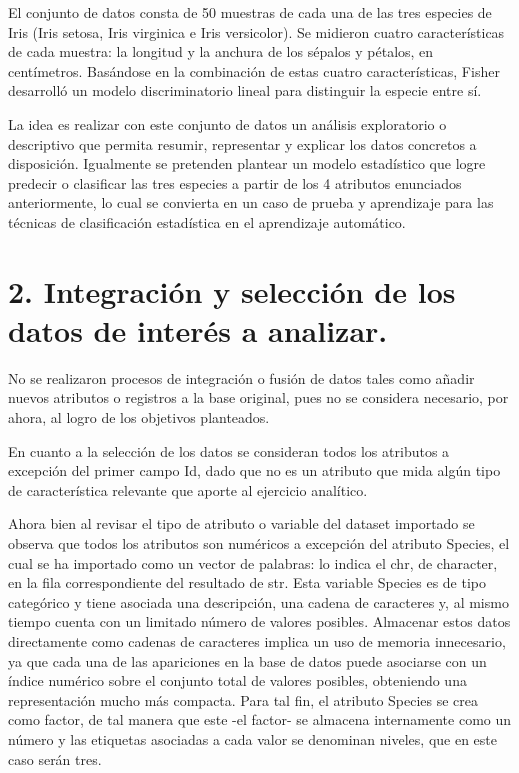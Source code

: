 \documentclass[
]{article}
\newenvironment{Shaded}{\begin{snugshade}}{\end{snugshade}}
\newcommand{\CommentTok}[1]{\textcolor[rgb]{0.56,0.35,0.01}{\textit{#1}}}
\newcommand{\ConstantTok}[1]{\textcolor[rgb]{0.00,0.00,0.00}{#1}}
\newcommand{\NormalTok}[1]{#1}
\newcommand{\OtherTok}[1]{\textcolor[rgb]{0.56,0.35,0.01}{#1}}
\newcommand{\SpecialCharTok}[1]{\textcolor[rgb]{0.00,0.00,0.00}{#1}}
\begin{document}
El conjunto de datos consta de 50 muestras de cada una de las tres
especies de Iris (Iris setosa, Iris virginica e Iris versicolor). Se
midieron cuatro características de cada muestra: la longitud y la
anchura de los sépalos y pétalos, en centímetros. Basándose en la
combinación de estas cuatro características, Fisher desarrolló un modelo
discriminatorio lineal para distinguir la especie entre sí.

La idea es realizar con este conjunto de datos un análisis exploratorio
o descriptivo que permita resumir, representar y explicar los datos
concretos a disposición. Igualmente se pretenden plantear un modelo
estadístico que logre predecir o clasificar las tres especies a partir
de los 4 atributos enunciados anteriormente, lo cual se convierta en un
caso de prueba y aprendizaje para las técnicas de clasificación
estadística en el aprendizaje automático.

\hypertarget{integraciuxf3n-y-selecciuxf3n-de-los-datos-de-interuxe9s-a-analizar.}{%
\section{2. Integración y selección de los datos de interés a
analizar.}\label{integraciuxf3n-y-selecciuxf3n-de-los-datos-de-interuxe9s-a-analizar.}}

No se realizaron procesos de integración o fusión de datos tales como
añadir nuevos atributos o registros a la base original, pues no se
considera necesario, por ahora, al logro de los objetivos planteados.

En cuanto a la selección de los datos se consideran todos los atributos
a excepción del primer campo Id, dado que no es un atributo que mida
algún tipo de característica relevante que aporte al ejercicio
analítico.

\begin{Shaded}
\end{Shaded}

Ahora bien al revisar el tipo de atributo o variable del dataset
importado se observa que todos los atributos son numéricos a excepción
del atributo Species, el cual se ha importado como un vector de
palabras: lo indica el chr, de character, en la fila correspondiente del
resultado de str. Esta variable Species es de tipo categórico y tiene
asociada una descripción, una cadena de caracteres y, al mismo tiempo
cuenta con un limitado número de valores posibles. Almacenar estos datos
directamente como cadenas de caracteres implica un uso de memoria
innecesario, ya que cada una de las apariciones en la base de datos
puede asociarse con un índice numérico sobre el conjunto total de
valores posibles, obteniendo una representación mucho más compacta. Para
tal fin, el atributo Species se crea como factor, de tal manera que este
-el factor- se almacena internamente como un número y las etiquetas
asociadas a cada valor se denominan niveles, que en este caso serán
tres.
\end{document}
